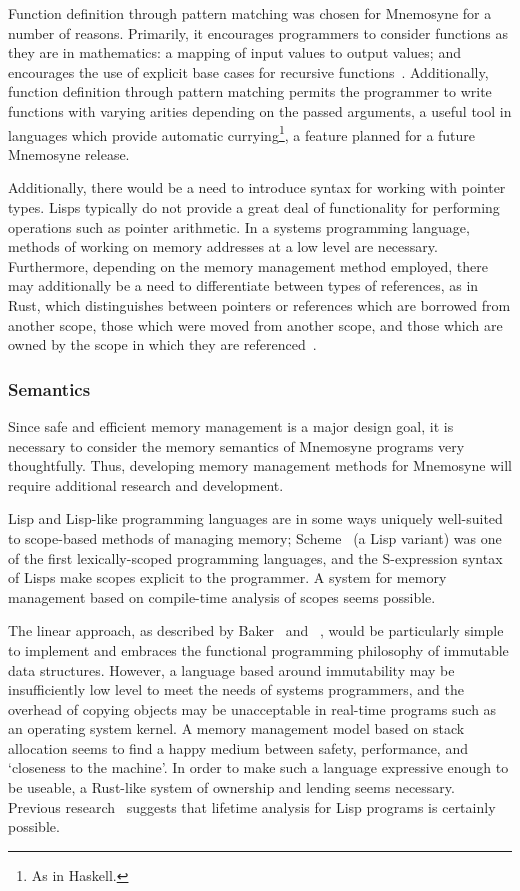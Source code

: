 \documentclass[11pt,a4paper]{article}
\theoremstyle{break}
\begin{document}
Function definition through pattern matching was chosen for Mnemosyne for a number of reasons. Primarily, it encourages programmers to consider functions as they are in mathematics: a mapping of input values to output values; and encourages the use of explicit base cases for recursive functions~\cite{hudak1992gentle}. Additionally, function definition through pattern matching permits the programmer to write functions with varying arities depending on the passed arguments, a useful tool in languages which provide automatic currying\footnote{As in Haskell.}, a feature planned for a future Mnemosyne release.

Additionally, there would be a need to introduce syntax for working with pointer types. Lisps typically do not provide a great deal of functionality for performing operations such as pointer arithmetic. In a systems programming language, methods of working on memory addresses at a low level are necessary. Furthermore, depending on the memory management method employed, there may additionally be a need to differentiate between types of references, as in Rust, which distinguishes between pointers or references which are borrowed from another scope, those which were moved from another scope, and those which are owned by the scope in which they are referenced~\cite{Matsakis:2014:RL:2663171.2663188}.

\subsubsection{Semantics}

Since safe and efficient memory management is a major design goal, it is necessary to consider the memory semantics of Mnemosyne programs very thoughtfully. Thus, developing memory management methods for Mnemosyne will require additional research and development.

Lisp and Lisp-like programming languages are in some ways uniquely well-suited to scope-based methods of managing memory; Scheme~\cite{r6rs} (a Lisp variant) was one of the first lexically-scoped programming languages, and the S-expression syntax of Lisps make scopes explicit to the programmer. A system for memory management based on compile-time analysis of scopes seems possible.

The linear approach, as described by Baker~\cite{Baker:1992:LLL:142137.142162,Baker:1995:UVL:199818.199860} and \citeauthor{hawblitzel2004low}~\cite{hawblitzel2004low}, would be particularly simple to implement and embraces the functional programming philosophy of immutable data structures. However, a language based around immutability may be insufficiently low level to meet the needs of systems programmers, and the overhead of copying objects may be unacceptable in real-time programs such as an operating system kernel. A memory management model based on stack allocation seems to find a happy medium between safety, performance, and `closeness to the machine'. In order to make such a language expressive enough to be useable, a Rust-like system of ownership and lending seems necessary. Previous research~\cite{sobalvarro1988lifetime} suggests that lifetime analysis for Lisp programs is certainly possible.
\end{document}
